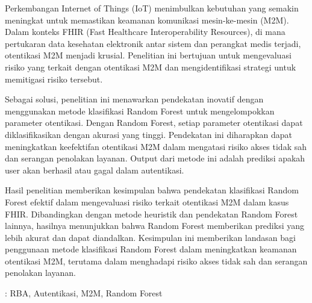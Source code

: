 Perkembangan Internet of Things (IoT) menimbulkan kebutuhan yang semakin meningkat untuk memastikan keamanan komunikasi mesin-ke-mesin (M2M). Dalam konteks FHIR (Fast Healthcare Interoperability Resources), di mana pertukaran data kesehatan elektronik antar sistem dan perangkat medis terjadi, otentikasi M2M menjadi krusial. Penelitian ini bertujuan untuk mengevaluasi risiko yang terkait dengan otentikasi M2M dan mengidentifikasi strategi untuk memitigasi risiko tersebut.

Sebagai solusi, penelitian ini menawarkan pendekatan inovatif dengan menggunakan metode klasifikasi Random Forest untuk mengelompokkan parameter otentikasi. Dengan Random Forest, setiap parameter otentikasi dapat diklasifikasikan dengan akurasi yang tinggi. Pendekatan ini diharapkan dapat meningkatkan keefektifan otentikasi M2M dalam mengatasi risiko akses tidak sah dan serangan penolakan layanan. Output dari metode ini adalah prediksi apakah user akan berhasil atau gagal dalam autentikasi.

Hasil penelitian memberikan kesimpulan bahwa pendekatan klasifikasi Random Forest efektif dalam mengevaluasi risiko terkait otentikasi M2M dalam kasus FHIR. Dibandingkan dengan metode heuristik dan pendekatan Random Forest lainnya, hasilnya menunjukkan bahwa Random Forest memberikan prediksi yang lebih akurat dan dapat diandalkan. Kesimpulan ini memberikan landasan bagi penggunaan metode klasifikasi Random Forest dalam meningkatkan keamanan otentikasi M2M, terutama dalam menghadapi risiko akses tidak sah dan serangan penolakan layanan.

 : RBA, Autentikasi, M2M, Random Forest
